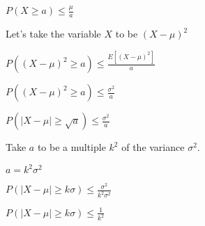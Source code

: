 \(P(X\ge a)\le \frac{\mu }{a}\)

Let’s take the variable \(X\) to be \((X-\mu )^2\)

\(P((X-\mu )^2\ge a)\le \frac{E[(X-\mu )^2]}{a}\)

\(P((X-\mu )^2\ge a)\le \frac{\sigma^2}{a}\)

\(P(|X-\mu | \ge \sqrt{a})\le \frac{\sigma^2}{a}\)

Take \(a\) to be a multiple \(k^2\) of the variance \(\sigma^2\).

\(a=k^2\sigma^2\)

\(P(|X-\mu | \ge k\sigma )\le \frac{\sigma^2}{k^2\sigma^2}\)

\(P(|X-\mu | \ge k\sigma )\le \frac{1}{k^2}\)

